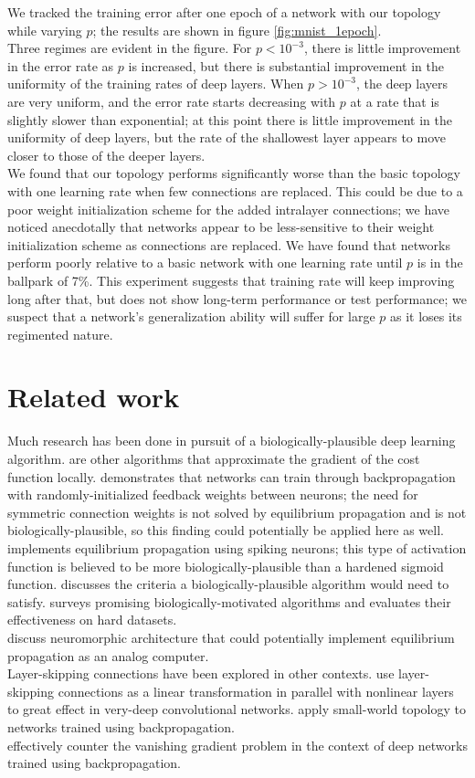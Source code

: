 \documentclass[format=sigconf]{acmart}
\newcommand{\npar}{\\\indent}
\begin{document}
We tracked the training error after one epoch of a network with our topology while varying $p$; the results are shown in figure \ref{fig:mnist_1epoch}.
\npar
Three regimes are evident in the figure. For $p<10^{-3}$, there is little improvement in the error rate as $p$ is increased, but there is substantial improvement in the uniformity of the training rates of deep layers. When $p>10^{-3}$, the deep layers are very uniform, and the error rate starts decreasing with $p$ at a rate that is slightly slower than exponential; at this point there is little improvement in the uniformity of deep layers, but the rate of the shallowest layer appears to move closer to those of the deeper layers.
\npar
We found that our topology performs significantly worse than the basic topology with one learning rate when few connections are replaced. This could be due to a poor weight initialization scheme for the added intralayer connections; we have noticed anecdotally that networks appear to be less-sensitive to their weight initialization scheme as connections are replaced. We have found that networks perform poorly relative to a basic network with one learning rate until $p$ is in the ballpark of 7\%. This experiment suggests that training rate will keep improving long after that, but does not show long-term performance or test performance; we suspect that a network's generalization ability will suffer for large $p$ as it loses its regimented nature.

\section{Related work}
Much research has been done in pursuit of a biologically-plausible deep learning algorithm. \cite{lee2015, xie2003, pineda1987} are other algorithms that approximate the gradient of the cost function locally. \cite{lillicrap2014} demonstrates that networks can train through backpropagation with randomly-initialized feedback weights between neurons; the need for symmetric connection weights is not solved by equilibrium propagation and is not biologically-plausible, so this finding could potentially be applied here as well. \cite{oconnor2018} implements equilibrium propagation using spiking neurons; this type of activation function is believed to be more biologically-plausible than a hardened sigmoid function. \cite{bengio2015} discusses the criteria a biologically-plausible algorithm would need to satisfy. \cite{bartunov2018} surveys promising biologically-motivated algorithms and evaluates their effectiveness on hard datasets.
\npar
\cite{shainline2019, davies2018, nahmias2013} discuss neuromorphic architecture that could potentially implement equilibrium propagation as an analog computer.
\npar
Layer-skipping connections have been explored in other contexts. \cite{he2015, srivastava2015} use layer-skipping connections as a linear transformation in parallel with nonlinear layers to great effect in very-deep convolutional networks. \cite{xiaohu2011, krishnan2019} apply small-world topology to networks trained using backpropagation.
\npar
\cite{ioffe2015, glorot2010} effectively counter the vanishing gradient problem in the context of deep networks trained using backpropagation.
\end{document}
